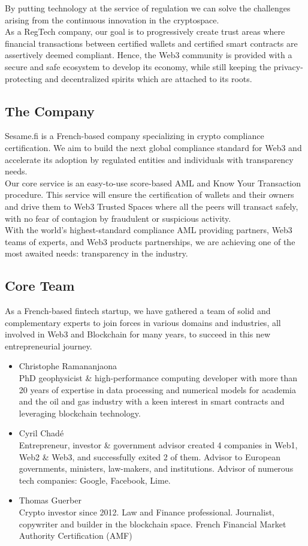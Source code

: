 ﻿\documentclass[a4paper]{article}
\newcommand{\smallvspace}{\vspace{4pt} \\}
\begin{document}
By putting technology at the service of regulation we can solve the challenges arising from the continuous innovation in the cryptospace. \\

As a RegTech company, our goal is to progressively create trust areas where financial transactions between certified wallets and certified smart contracts are assertively deemed compliant. Hence, the Web3 community is provided with a secure and safe ecosystem to develop its economy, while still keeping the privacy-protecting and decentralized spirits which are attached to its roots.

\subsection{The Company}
Sesame.fi is a French-based company specializing in crypto compliance certification. We aim to build the next global compliance standard for Web3 and accelerate its adoption by regulated entities and individuals with transparency needs. \\

Our core service is an easy-to-use score-based AML and Know Your Transaction procedure. This service will ensure the certification of wallets and their owners and drive them to Web3 Trusted Spaces where all the peers will transact safely, with no fear of contagion by fraudulent or suspicious activity. \\

With the world’s highest-standard compliance AML providing partners, Web3 teams of experts, and Web3 products partnerships, we are achieving one of the most awaited needs: transparency in the industry.
\subsection{Core Team}
As a French-based fintech startup, we have gathered a team of solid and complementary experts to join forces in various domains and industries, all involved in Web3 and Blockchain for many years, to succeed in this new entrepreneurial journey.

\begin{itemize}
\item 
Christophe Ramananjaona \smallvspace
PhD geophysicist \& high-performance computing developer with more than 20 years of expertise in data processing and numerical models for academia and the oil and gas industry with a keen interest in smart contracts and leveraging blockchain technology.

\item 
Cyril Chadé \smallvspace
Entrepreneur, investor \& government advisor created 4 companies in Web1, Web2 \& Web3, and successfully exited 2 of them. Advisor to European governments, ministers, law-makers, and institutions. Advisor of numerous tech companies: Google, Facebook, Lime. 

\item 
Thomas Guerber \smallvspace
Crypto investor since 2012. Law and Finance professional. Journalist, copywriter and builder in the blockchain space. French Financial Market Authority Certification (AMF)
\end{itemize}
\end{document}
